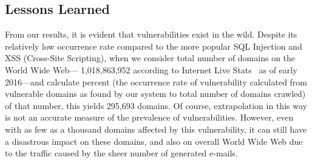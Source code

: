 \subsection{Lessons Learned}
From our results, it is evident that \ehi vulnerabilities exist in the wild.
Despite its relatively low occurrence rate compared to the more popular SQL Injection and XSS (Cross-Site Scripting), when we consider total number of domains on the World Wide Web--- 1,018,863,952 according to Internet Live Stats~\cite{InternetLiveStats2016} as of early 2016---and calculate \successWebsitesDelta percent (the occurrence rate of \ehi vulnerability calculated from vulnerable domains as found by our system to total number of domains crawled) of that number, this yields 295,693 domains. Of course, extrapolation in this way is not an accurate measure of the prevalence of \ehi vulnerabilities. However, even with as few as a thousand domains affected by this vulnerability, it can still have a disastrous impact on these domains, and also on overall World Wide Web due to the traffic caused by the sheer number of generated e-mails. 
    
    
    
